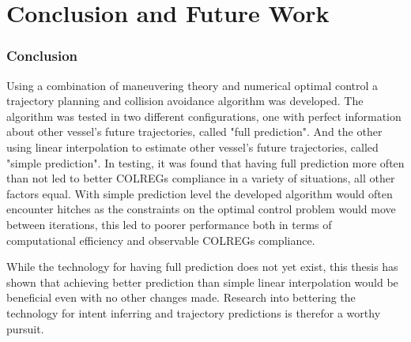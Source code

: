 \section{Conclusion and Future Work}

\subsubsection*{Conclusion}


Using a combination of maneuvering theory and numerical optimal control a trajectory planning and collision avoidance
algorithm was developed. The algorithm was tested in two different configurations, one with perfect information about
other vessel's future trajectories, called "full prediction". And the other using linear interpolation to estimate other vessel's future trajectories, called "simple prediction".
In testing, it was found that having full prediction more often than not led to better COLREGs compliance in a variety of situations, all other factors equal.
With simple prediction level the developed algorithm would often encounter hitches as the constraints on the optimal control problem would move between iterations,
this led to poorer performance both in terms of computational efficiency and observable COLREGs compliance.

While the technology for having full prediction does not yet exist, this thesis has shown that achieving better prediction than simple linear interpolation
would be beneficial even with no other changes made. Research into bettering the technology for intent inferring and trajectory predictions is therefor
a worthy pursuit.

